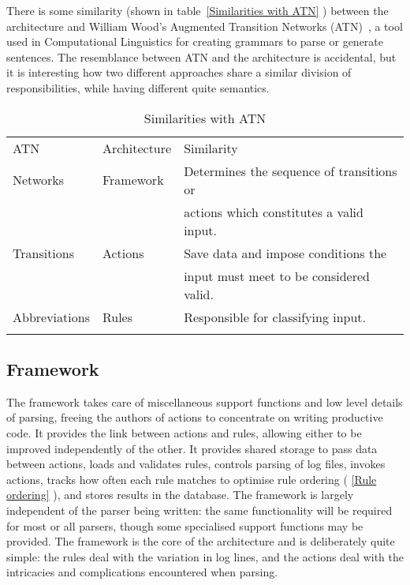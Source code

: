 \documentclass[draft]{svmult}
\newcommand{\tabletopline}[0]{%
    \hline%
    \noalign{\smallskip}%
}
\newcommand{\tablebottomline}[0]{%
    \noalign{\smallskip}%
    \hline%
}
\newcommand{\tablemiddleline}[0]{%
    \noalign{\smallskip}%
    \hline%
    \noalign{\smallskip}%
}
\newcommand{\sectionref}[1]{%
    \textsection{}\vref*{#1}%
}
\newcommand{\refwithlabel}[2]{%
    #1~\vref{#2}%
}
\newcommand{\tableref}[1]{%
    \refwithlabel{table}{#1}%
}
\begin{document}
There is some similarity (shown in \tableref{Similarities with ATN})
between the architecture and William Wood's Augmented Transition Networks
(ATN)~\cite{atns, nlpip}, a tool used in Computational Linguistics for
creating grammars to parse or generate sentences.  The resemblance between
ATN and the architecture is accidental, but it is interesting how two
different approaches share a similar division of responsibilities, while
having different quite semantics.


\begin{table}[hbtp]
    \caption{Similarities with ATN}\label{Similarities with ATN}
    \begin{tabular}[]{lll}
        \tabletopline{}%
        ATN           & Architecture    & Similarity                                \\
        \tablemiddleline{}%
        Networks      & Framework       & Determines the sequence of transitions or \\
                      &                 & actions which constitutes a valid input.  \\
        Transitions   & Actions         & Save data and impose conditions the       \\
                      &                 & input must meet to be considered valid.   \\
        Abbreviations & Rules           & Responsible for classifying input.        \\
        \tablebottomline{}%
    \end{tabular}
\end{table}

\subsection{Framework}

\label{Framework}

The framework takes care of miscellaneous support functions and low level
details of parsing, freeing the authors of actions to concentrate on
writing productive code.  It provides the link between actions and rules,
allowing either to be improved independently of the other.  It provides
shared storage to pass data between actions, loads and validates rules,
controls parsing of log files, invokes actions, tracks how often each rule
matches to optimise rule ordering (\sectionref{Rule ordering}), and stores
results in the database.  The framework is largely independent of the
parser being written: the same functionality will be required for most or
all parsers, though some specialised support functions may be provided.
The framework is the core of the architecture and is deliberately quite
simple: the rules deal with the variation in log lines, and the actions
deal with the intricacies and complications encountered when parsing.
\end{document}
